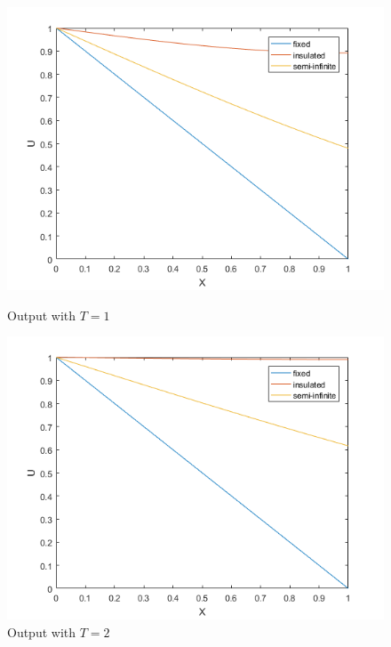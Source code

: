 \documentclass[10pt,a4paper]{report}
\begin{document}
\begin{figure}[ht]
\begin{minipage}[b]{0.5\linewidth}
\centering
\includegraphics[width=\textwidth]{anal1}
\caption{Output with $T=1$}
\end{minipage}
\hspace{0.5cm}
\begin{minipage}[b]{0.5\linewidth}
\centering
\includegraphics[width=\textwidth]{anal2}
\caption{Output with $T=2$}
\end{minipage}
\end{figure}





\newpage 
\end{document}
